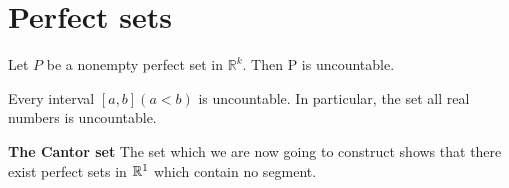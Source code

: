 \section{Perfect sets}


\begin{thm}\label{thm:2.43 uncountable}
    Let $P$ be a nonempty perfect set in $\mathbb{R}^k$. Then P is uncountable.    
\end{thm}





\begin{myCorollary}
	Every interval $[a, b] (a <b)$ is uncountable. In particular, the set
	all real numbers is uncountable.
\end{myCorollary}


\begin{myDef}
	\textbf{The Cantor set} The set which we are now going to construct shows
	that there exist perfect sets in ${\protect\mathbb R}^{1}$ which contain no segment.
\end{myDef}


